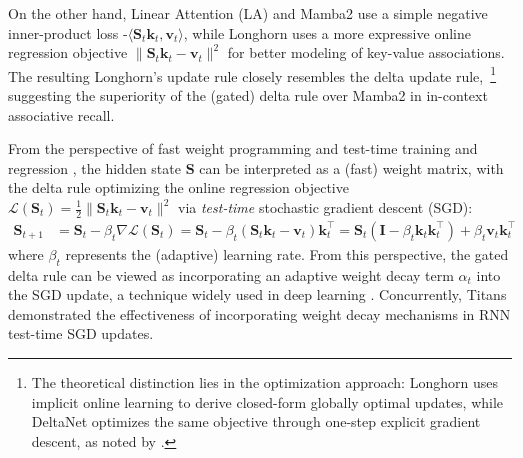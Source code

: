 \documentclass{article}
\def\rmI{{\mathbf{I}}}
\def\rmS{{\mathbf{S}}}
\def\vk{{\bm{k}}}
\def\vv{{\bm{v}}}
\begin{document}
On the other hand, Linear Attention (LA) and Mamba2 use a simple negative inner-product loss -$\langle\rmS_t \vk_t, \vv_t\rangle$, while Longhorn \citep{longhorn} uses a more expressive online regression objective $\|\rmS_t\vk_t - \vv_t\|^2$ for better modeling of key-value associations. The resulting Longhorn's update rule closely resembles the delta update rule,~\footnote{The theoretical distinction lies in the optimization approach: Longhorn uses implicit online learning \citep{Kulis2010ImplicitOL} to derive closed-form globally optimal updates, while DeltaNet optimizes the same objective through one-step explicit gradient descent, as noted by \citet{longhorn}.
} suggesting the superiority of the (gated) delta rule over Mamba2 in in-context associative recall.

From the perspective of fast weight programming \citep{Irie2022TheDF} and test-time training \citep{ttt} and regression \citep{wang2025testtimeregressionunifyingframework}, the hidden state $\rmS$ can be interpreted as a (fast) weight matrix, with the delta rule optimizing the online regression objective $\mathcal{L}(\rmS_t)=\frac{1}{2} \| \rmS_t\vk_t - \vv_t \|^2$ via \emph{test-time} stochastic gradient descent (SGD):
\begin{align*}
\rmS_{t+1} &= \rmS_{t} - \beta_t \nabla \mathcal{L}(\rmS_t) 
= \rmS_{t} - \beta_t (\rmS_t\vk_t - \vv_t)\vk_t^\intercal = \rmS_{t}\left(\rmI-\beta_t\vk_t\vk_t^\intercal\right) + \beta_t \vv_t\vk_t^\intercal
\end{align*}
where $\beta_t$ represents the (adaptive) learning rate. From this perspective, the gated delta rule can be viewed as incorporating an adaptive weight decay term $\alpha_t$ into the SGD update, a technique widely used in deep learning \citep{Krogh1991ASW,Andriushchenko2023WhyDW}. Concurrently, Titans \citep{behrouz2024titanslearningmemorizetest} demonstrated the effectiveness of incorporating weight decay mechanisms in RNN test-time SGD updates. 
\end{document}
